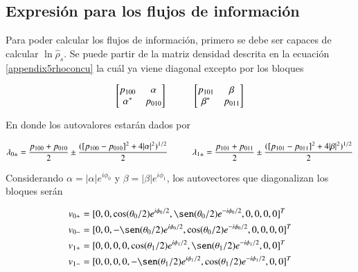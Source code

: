 \begin{appendixs}
\label{appendix5drazin}

\subsection{Expresión para los flujos de información}
Para poder calcular los flujos de información, primero se debe ser capaces de calcular $\ln \hat{\rho}_{s}$. Se puede partir de la matriz densidad descrita en la ecuación \ref{appendix5rhoconcu} la cuál ya viene diagonal excepto por los bloques

\begin{equation*}
    \begin{bmatrix}
        p_{100} & \alpha \\
        \alpha^{*} & p_{010}
    \end{bmatrix}
    \hspace{10mm}
    \begin{bmatrix}
        p_{101} & \beta \\
        \beta^{*} & p_{011}
    \end{bmatrix} 
\end{equation*}

En donde los autovalores estarán dados por

\begin{equation*}
    \lambda_{0\pm} = \frac{ p_{100} +p_{010} }{2} \pm \frac{( [p_{100} - p_{010}]^{2} + 4|\alpha|^{2} )^{1/2} }{ 2 }  \hspace{10mm}      \lambda_{1\pm} = \frac{ p_{101} +p_{011} }{2} \pm \frac{( [p_{101} - p_{011}]^{2} + 4|\beta|^{2} )^{1/2} }{ 2 } 
\end{equation*}

Considerando $\alpha = |\alpha|e^{i\phi_{0}}$ y $\beta = |\beta|e^{i\phi_{1}}$, los autovectores que diagonalizan los bloques serán

\begin{align*}
    v_{0+} &  = [0,0,\cos(\theta_{0}/2)e^{i\phi_{0}/2},\sen(\theta_{0}/2)e^{-i\phi_{0}/2},0,0,0,0]^{T} \\
    v_{0-} &  = [0,0,-\sen(\theta_{0}/2)e^{i\phi_{0}/2},\cos(\theta_{0}/2)e^{-i\phi_{0}/2},0,0,0,0]^{T} \\
    v_{1+} &  = [0,0,0,0,\cos(\theta_{1}/2)e^{i\phi_{1}/2},\sen(\theta_{1}/2)e^{-i\phi_{1}/2},0,0]^{T} \\
    v_{1-} &  = [0,0,0,0,-\sen(\theta_{1}/2)e^{i\phi_{1}/2},\cos(\theta_{1}/2)e^{-i\phi_{1}/2},0,0]^{T}                   
\end{align*}


\end{appendixs}

